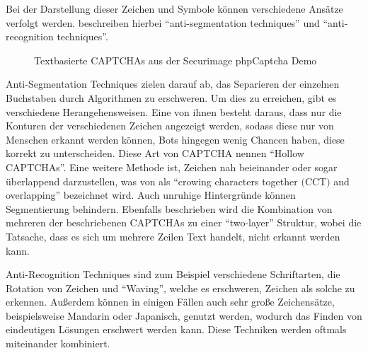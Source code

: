 Bei der Darstellung dieser Zeichen und Symbole können verschiedene Ansätze verfolgt werden.
\citeauthor{surveyofresearch} beschreiben hierbei ``anti-segmentation techniques'' und ``anti-recognition techniques''. \cite[p.76]{surveyofresearch}

\begin{figure}[h!]
    \centering
    \qquad
    \caption{Textbasierte CAPTCHAs aus der Securimage phpCaptcha Demo}   
    \label{fig:textbased}
\end{figure}

Anti-Segmentation Techniques zielen darauf ab, das Separieren der einzelnen Buchstaben durch Algorithmen zu erschweren. 
Um dies zu erreichen, gibt es verschiedene Herangehensweisen.
Eine von ihnen besteht daraus, dass nur die Konturen der verschiedenen Zeichen angezeigt werden, sodass diese nur von Menschen erkannt werden können,
Bots hingegen wenig Chancen haben, diese korrekt zu unterscheiden. Diese Art von CAPTCHA nennen \citeauthor{surveyofresearch} ``Hollow CAPTCHAs''. %
Eine weitere Methode ist, Zeichen nah beieinander oder sogar überlappend darzustellen, 
was von \citeauthor{surveyofresearch} als ``crowing characters together $($CCT$)$ and overlapping'' bezeichnet wird.
Auch unruhige Hintergründe können Segmentierung behindern.
Ebenfalls beschrieben wird die Kombination von mehreren der beschriebenen CAPTCHAs zu einer ``two-layer'' Struktur,
wobei die Tatsache, dass es sich um mehrere Zeilen Text handelt, nicht erkannt werden kann. \cite[p.76]{surveyofresearch}

Anti-Recognition Techniques sind zum Beispiel verschiedene Schriftarten, die Rotation von Zeichen und ``Waving'', 
welche es erschweren, Zeichen als solche zu erkennen. 
Außerdem können in einigen Fällen auch sehr große Zeichensätze, beispielsweise Mandarin oder Japanisch, genutzt werden, 
wodurch das Finden von eindeutigen Lösungen erschwert werden kann.
Diese Techniken werden oftmals miteinander kombiniert.
\cite[p.77]{surveyofresearch}

